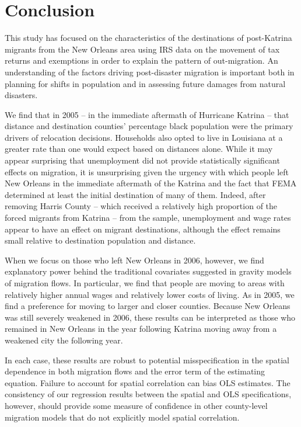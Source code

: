 \documentclass[]{article}
\begin{document}
\section{\texorpdfstring{Conclusion
\label{sec:conclusion}}{Conclusion }}\label{conclusion}

This study has focused on the characteristics of the destinations of
post-Katrina migrants from the New Orleans area using IRS data on the
movement of tax returns and exemptions in order to explain the pattern
of out-migration. An understanding of the factors driving post-disaster
migration is important both in planning for shifts in population and in
assessing future damages from natural disasters.

We find that in 2005 -- in the immediate aftermath of Hurricane Katrina
-- that distance and destination counties' percentage black population
were the primary drivers of relocation decisions. Households also opted
to live in Louisiana at a greater rate than one would expect based on
distances alone. While it may appear surprising that unemployment did
not provide statistically significant effects on migration, it is
unsurprising given the urgency with which people left New Orleans in the
immediate aftermath of the Katrina and the fact that FEMA determined at
least the initial destination of many of them. Indeed, after removing
Harris County -- which received a relatively high proportion of the
forced migrants from Katrina -- from the sample, unemployment and wage
rates appear to have an effect on migrant destinations, although the
effect remains small relative to destination population and distance.

When we focus on those who left New Orleans in 2006, however, we find
explanatory power behind the traditional covariates suggested in gravity
models of migration flows. In particular, we find that people are moving
to areas with relatively higher annual wages and relatively lower costs
of living. As in 2005, we find a preference for moving to larger and
closer counties. Because New Orleans was still severely weakened in
2006, these results can be interpreted as those who remained in New
Orleans in the year following Katrina moving away from a weakened city
the following year.

In each case, these results are robust to potential misspecification in
the spatial dependence in both migration flows and the error term of the
estimating equation. Failure to account for spatial correlation can bias
OLS estimates. The consistency of our regression results between the
spatial and OLS specifications, however, should provide some measure of
confidence in other county-level migration models that do not explicitly
model spatial correlation.
\end{document}
